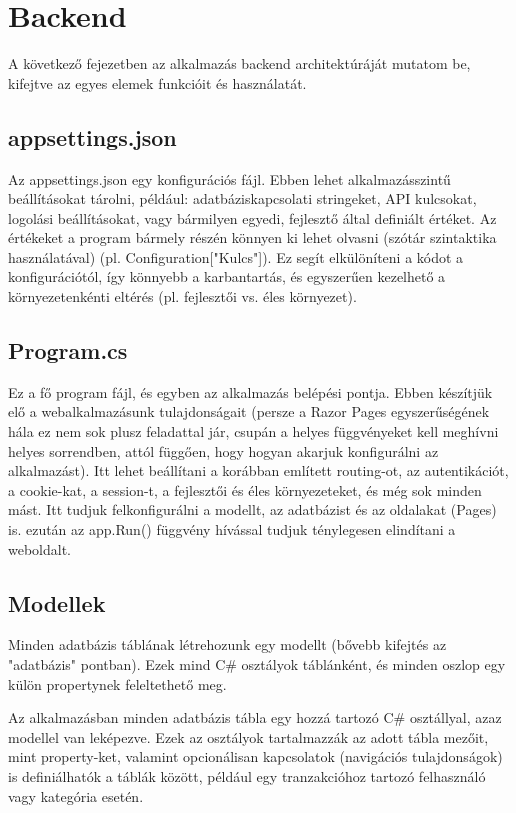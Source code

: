 \section{Backend}

A következő fejezetben az alkalmazás backend architektúráját mutatom be, kifejtve az egyes elemek funkcióit és használatát.

\subsection{appsettings.json}

Az appsettings.json egy konfigurációs
fájl. Ebben lehet alkalmazásszintű beállításokat tárolni, például:
adatbáziskapcsolati stringeket,
API kulcsokat,
logolási beállításokat,
vagy bármilyen egyedi, fejlesztő által definiált értéket.
Az értékeket a program bármely részén könnyen ki lehet olvasni (szótár szintaktika használatával)  (pl. Configuration["Kulcs"]). Ez segít elkülöníteni a kódot a
konfigurációtól, így könnyebb a karbantartás, és egyszerűen kezelhető a környezetenkénti
eltérés (pl. fejlesztői vs. éles környezet).

\subsection{Program.cs}
Ez a fő program fájl, és egyben az alkalmazás belépési pontja. Ebben készítjük
elő a webalkalmazásunk tulajdonságait (persze a Razor Pages egyszerűségének
hála ez nem sok plusz feladattal jár, csupán a helyes függvényeket
kell meghívni helyes sorrendben, attól függően, hogy hogyan
akarjuk konfigurálni az alkalmazást). Itt lehet beállítani a
korábban említett routing-ot, az autentikációt, a cookie-kat,
a session-t, a fejlesztői és éles környezeteket, és még sok minden mást. Itt tudjuk felkonfigurálni a modellt, az adatbázist
és az oldalakat (Pages) is. ezután az app.Run() függvény hívással
tudjuk ténylegesen elindítani a weboldalt.

\subsection{Modellek}
Minden adatbázis táblának létrehozunk egy modellt
(bővebb kifejtés az "adatbázis" pontban). Ezek mind C\# osztályok
táblánként, és minden oszlop egy külön propertynek feleltethető meg.

Az alkalmazásban minden adatbázis tábla egy hozzá tartozó C\# osztállyal, azaz modellel van leképezve. Ezek az osztályok tartalmazzák az adott tábla mezőit, mint property-ket, valamint opcionálisan kapcsolatok (navigációs tulajdonságok) is definiálhatók a táblák között, például egy tranzakcióhoz tartozó felhasználó vagy kategória esetén.

